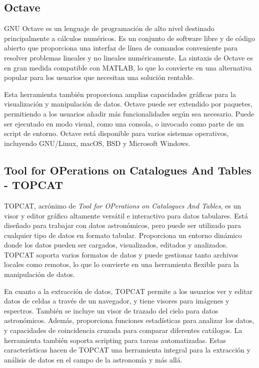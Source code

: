 \subsection{Octave} \label{sec:tool_octave}
GNU Octave es un lenguaje de programación de alto nivel destinado principalmente a cálculos numéricos. Es un conjunto de software libre y de código abierto que proporciona una interfaz de línea de comandos conveniente para resolver problemas lineales y no lineales numéricamente. La sintaxis de Octave es en gran medida compatible con MATLAB, lo que lo convierte en una alternativa popular para los usuarios que necesitan una solución rentable.\par 

Esta herramienta también proporciona amplias capacidades gráficas para la visualización y manipulación de datos. Octave puede ser extendido por paquetes, permitiendo a los usuarios añadir más funcionalidades según sea necesario. Puede ser ejecutado en modo visual, como una consola, o invocado como parte de un script de entorno. Octave está disponible para varios sistemas operativos, incluyendo GNU/Linux, macOS, BSD y Microsoft Windows.

\subsection{Tool for OPerations on Catalogues And Tables - TOPCAT} \label{sec:tool_topcat}
TOPCAT, acrónimo de \textit{Tool for OPerations on Catalogues And Tables}, es un visor y editor gráfico altamente versátil e interactivo para datos tabulares. Está diseñado para trabajar con datos astronómicos, pero puede ser utilizado para cualquier tipo de datos en formato tabular. Proporciona un entorno dinámico donde los datos pueden ser cargados, visualizados, editados y analizados. TOPCAT soporta varios formatos de datos y puede gestionar tanto archivos locales como remotos, lo que lo convierte en una herramienta flexible para la manipulación de datos.\par

En cuanto a la extracción de datos, TOPCAT permite a los usuarios ver y editar datos de celdas a través de un navegador, y tiene visores para imágenes y espectros. También se incluye un visor de trazado del cielo para datos astronómicos. Además, proporciona funciones estadísticas para analizar los datos, y capacidades de coincidencia cruzada para comparar diferentes catálogos. La herramienta también soporta scripting para tareas automatizadas. Estas características hacen de TOPCAT una herramienta integral para la extracción y análisis de datos en el campo de la astronomía y más allá.\par

